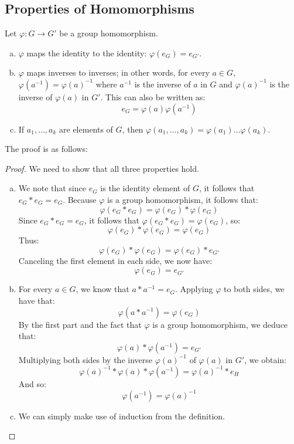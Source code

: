 \documentclass[letterpaper]{article}
\begin{document}
\subsection{Properties of Homomorphisms}
\begin{mdframed}
    \begin{proposition}
        Let $\varphi: G \to G'$ be a group homomorphism. 
        \begin{enumerate}[(a)]
            \item $\varphi$ maps the identity to the identity: $\varphi(e_G) = e_{G'}$. 
            \item $\varphi$ maps inverses to inverses; in other words, for every $a \in G$, $\varphi(a^{-1}) = \varphi(a)^{-1}$ where $a^{-1}$ is the inverse of $a$ in $G$ and $\varphi(a)^{-1}$ is the inverse of $\varphi(a)$ in $G'$. This can also be written as: 
            \[e_G = \varphi(a) \varphi(a^{-1})\]
            \item If $a_1, \dots, a_k$ are elements of $G$, then $\varphi(a_1, \dots, a_k) = \varphi(a_1) \dots \varphi(a_k)$. 
        \end{enumerate}
    \end{proposition}
\end{mdframed}

The proof is as follows: 
\begin{mdframed}
    \begin{proof}
        We need to show that all three properties hold. 
        \begin{enumerate}[(a)]
            \item We note that since $e_G$ is the identity element of $G$, it follows that $e_G * e_G = e_G$. Because $\varphi$ is a group homomorphism, it follows that: 
            \[\boxed{\varphi(e_G * e_G)} = \varphi(e_G) * \varphi(e_G)\]
            Since $e_G * e_G = e_G$, it follows that $\varphi(e_G * e_G) = \varphi(e_G)$, so: 
            \[\varphi(e_G) * \varphi(e_G) = \boxed{\varphi(e_G)}\]
            Thus: 
            \[\varphi(e_G) * \varphi(e_G) = \varphi(e_G) * e_{G'}\]
            Canceling the first element in each side, we now have: 
            \[\varphi(e_G) = e_{G'}\]

            \item For every $a \in G$, we know that $a * a^{-1} = e_G$. Applying $\varphi$ to both sides, we have that: 
            \[\varphi(a * a^{-1}) = \varphi(e_G)\]
            By the first part and the fact that $\varphi$ is a group homomorphism, we deduce that: 
            \[\varphi(a) * \varphi(a^{-1}) = e_{G'}\]
            Multiplying both sides by the inverse $\varphi(a)^{-1}$ of $\varphi(a)$ in $G'$, we obtain: 
            \[\varphi(a)^{-1} * \varphi(a) * \varphi(a^{-1}) = \varphi(a)^{-1} * e_H\]
            And so:
            \[\varphi(a^{-1}) = \varphi(a)^{-1}\]

            \item We can simply make use of induction from the definition. \qedhere
        \end{enumerate}
    \end{proof}
\end{mdframed}
\end{document}
